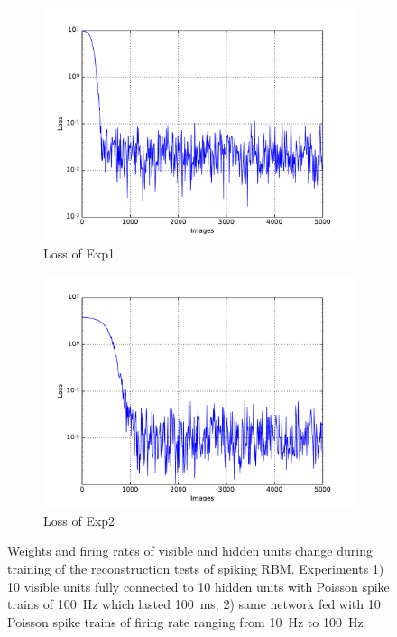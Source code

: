 \begin{figure}
\begin{subfigure}[t]{0.4\textwidth}
		\includegraphics[width=\textwidth]{pics_sdlm/13_exp_SRBM_noise_long/exp1_mse_nons.pdf}
		\caption{Loss of Exp1}
	\end{subfigure}
	\begin{subfigure}[t]{0.4\textwidth}
		\includegraphics[width=\textwidth]{pics_sdlm/13_exp_SRBM_noise_long/exp2_mse_nons.pdf}
		\caption{Loss of Exp2}
	\end{subfigure}
	\caption{Weights and firing rates of visible and hidden units change during training of the reconstruction tests of spiking RBM. 
		Experiments 1) 10 visible units fully connected to 10 hidden units with Poisson spike trains of 100~Hz which lasted 100~ms; 2) same network fed with 10 Poisson spike trains of firing rate ranging from 10~Hz to 100~Hz.}
\end{figure}



